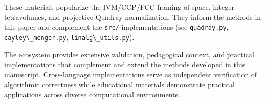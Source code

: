 \documentclass[
  10pt,
]{article}
\newcommand{\passthrough}[1]{#1}
\begin{document}
These materials popularize the IVM/CCP/FCC framing of space, integer
tetravolumes, and projective Quadray normalization. They inform the
methods in this paper and complement the \passthrough{\lstinline!src/!}
implementations (see \passthrough{\lstinline!quadray.py!},
\passthrough{\lstinline!cayley\_menger.py!},
\passthrough{\lstinline!linalg\_utils.py!}).

The ecosystem provides extensive validation, pedagogical context, and
practical implementations that complement and extend the methods
developed in this manuscript. Cross-language implementations serve as
independent verification of algorithmic correctness while educational
materials demonstrate practical applications across diverse
computational environments.
\end{document}
